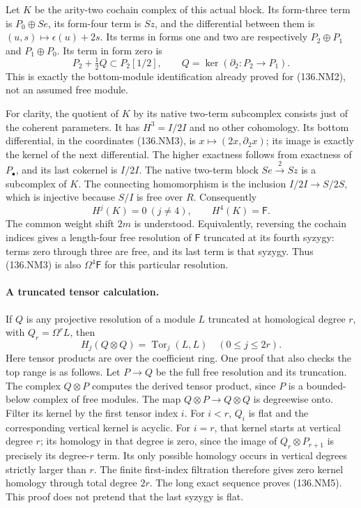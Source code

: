 Let \(K\) be the arity-two cochain complex of this actual
block. Its form-three term is \(P_0\oplus Se\), its
form-four term is \(Sz\), and the differential between them
is \((u,s)\mapsto\epsilon(u)+2s\). Its terms in forms one
and two are respectively \(P_2\oplus P_1\) and
\(P_1\oplus P_0\). Its term in form zero is
\[
 P_2+\tfrac12Q\subset P_2[1/2],
       \qquad Q=\ker(\partial_2:P_2\to P_1).
                                                               \tag{136.NM3}
\]
This is exactly the bottom-module identification already proved
for (136.NM2), not an assumed free module.

For clarity, the quotient of \(K\) by its native two-term
subcomplex consists just of the coherent parameters. It has
\(H^3=I/2I\) and no other cohomology. Its
bottom differential, in the coordinates (136.NM3), is
\(x\mapsto(2x,\partial_2x)\); its image is exactly the
kernel of the next differential. The higher exactness follows
from exactness of \(P_\bullet\), and its last cokernel is
\(I/2I\). The native two-term block \(Se\xrightarrow{2}Sz\)
is a subcomplex of \(K\). The connecting homomorphism is the
inclusion \(I/2I\to S/2S\), which is injective because
\(S/I\) is free over \(R\). Consequently
\[
                  H^j(K)=0\ (j\ne4),\qquad H^4(K)=\mathsf F.
                                                               \tag{136.NM4}
\]
The common weight shift \(2m\) is understood. Equivalently,
reversing the cochain indices gives a length-four free resolution
of \(\mathsf F\) truncated at its fourth syzygy: terms zero through
three are free, and its last term is that syzygy. Thus (136.NM3)
is also \(\Omega^4\mathsf F\) for this particular resolution.

\paragraph{A truncated tensor calculation.}
If \(Q\) is any projective resolution of a module \(L\)
truncated at homological degree \(r\), with
\(Q_r=\Omega^rL\), then
\[
                 H_j(Q\otimes Q)=\operatorname{Tor}_j(L,L)
                              \quad(0\leq j\leq2r).
                                                               \tag{136.NM5}
\]
Here tensor products are over the coefficient ring.
One proof that also checks the top range is as follows.
Let \(P\to Q\) be the full free resolution and its truncation.
The complex \(Q\otimes P\) computes the derived tensor
product, since \(P\) is a bounded-below complex of free modules.
The map \(Q\otimes P\to Q\otimes Q\) is degreewise onto.
Filter its kernel by the first tensor index \(i\).
For \(i<r\), \(Q_i\) is flat and the corresponding vertical
kernel is acyclic. For \(i=r\), that kernel starts at vertical
degree \(r\); its homology in that degree is zero, since the
image of \(Q_r\otimes P_{r+1}\) is precisely its degree-\(r\)
term. Its only possible homology occurs in vertical degrees
strictly larger than \(r\). The finite first-index filtration
therefore gives zero kernel homology through total degree \(2r\).
The long exact sequence proves (136.NM5). This proof does not
pretend that the last syzygy is flat.

